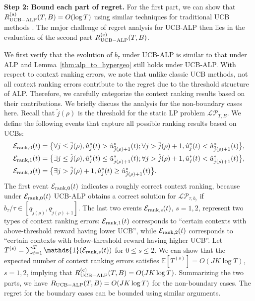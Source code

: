 \textbf{Step 2: Bound each part of regret. }
For the first part, we can show that $R^{\rm (a)}_{\rm{UCB-ALP}}(T, B) = O(\log T)$ using similar techniques for
traditional UCB methods \cite{Golovin2009Lecture}.
The major challenge of regret analysis for UCB-ALP then lies in the evaluation of the second part $R_{\rm {UCB-ALP}}^{({\rm c})}(T, B)$.

We first verify that the evolution of $b_\tau$ under UCB-ALP is similar to that under ALP and Lemma~\ref{thm:alp_to_hypergeo} still holds under UCB-ALP. With respect to context ranking errors, we note that unlike classic UCB methods,  not all context ranking errors contribute to the regret due to the threshold structure of ALP. Therefore, we carefully categorize the context ranking results based on their contributions. We briefly discuss the analysis for the non-boundary cases here. Recall that $\tilde{j}(\rho)$ is the threshold for the static LP problem $\mathcal{LP}_{T,B}$. We define the following events that capture all possible ranking results based on UCBs:
\begin{align}
&\mathcal{E}_{\rm rank,0}(t) = \big\{\forall j \leq \tilde{j}(\rho), \hat{u}^*_j(t) > \hat{u}^*_{\tilde{j}(\rho) +1}(t); \forall j > \tilde{j}(\rho) +1,\hat{u}^*_j(t) < \hat{u}^*_{\tilde{j}(\rho) +1}(t)\big\},\nonumber\\
&\mathcal{E}_{\rm rank,1}(t)  = \big\{\exists j \leq \tilde{j}(\rho), \hat{u}^*_j(t) \leq \hat{u}^*_{\tilde{j}(\rho) +1}(t); \forall j > \tilde{j}(\rho) +1,\hat{u}^*_j(t) < \hat{u}^*_{\tilde{j}(\rho) +1}(t)\big\},\nonumber\\
&\mathcal{E}_{\rm rank,2}(t)  = \big\{\exists j > \tilde{j}(\rho) +1,\hat{u}^*_j(t) \geq \hat{u}^*_{\tilde{j}(\rho) +1}(t)\big\}. \nonumber
\end{align}
The first event  $\mathcal{E}_{\rm rank,0}(t)$ indicates a roughly correct context ranking, because under $\mathcal{E}_{\rm rank,0}(t)$ UCB-ALP obtains a correct solution for $\mathcal{LP}_{\tau, b_{\tau}}$ if  $b_{\tau}/\tau \in [q_{\tilde{j}(\rho)}, q_{\tilde{j}(\rho) + 1}]$. The last two events $\mathcal{E}_{\rm rank,s}(t)$, $s = 1, 2$, represent two types of context ranking errors: $\mathcal{E}_{\rm rank,1}(t)$ corresponds to ``certain contexts with above-threshold reward having lower UCB'', while $\mathcal{E}_{\rm rank,2}(t)$ corresponds to ``certain contexts with below-threshold reward having higher UCB''.
Let $T^{(s)} = \sum_{t = 1}^T \mathds{1}(\mathcal{E}_{{\rm rank}, s}(t))$ for $0 \leq s \leq 2$.
We can show that the expected number of context ranking errors satisfies $\mathbb{E}[T^{(s)}] = O(JK\log T)$, $s = 1,2$, implying that $R_{\rm {UCB-ALP}}^{({\rm c})}(T, B) = O(JK\log T)$. Summarizing the two parts, we have $R_{\rm {UCB-ALP}}(T, B) = O(JK\log T)$ for the non-boundary cases. The regret for the boundary cases can be bounded using similar arguments.

